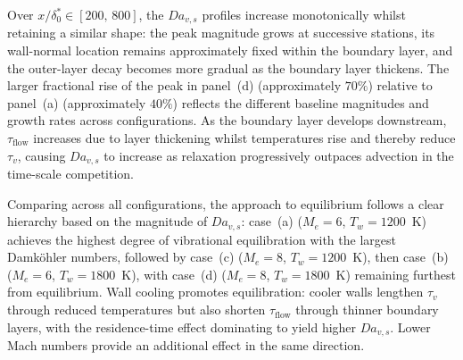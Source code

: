 Over \(x/\delta_0^{*}\in[200,\,800]\), the \(Da_{v,s}\) profiles increase monotonically whilst retaining a similar shape: the peak magnitude grows at successive stations, its wall-normal location remains approximately fixed within the boundary layer, and the outer-layer decay becomes more gradual as the boundary layer thickens. The larger fractional rise of the peak in panel~(d) (approximately \(70\%\)) relative to panel~(a) (approximately \(40\%\)) reflects the different baseline magnitudes and growth rates across configurations. As the boundary layer develops downstream, \(\tau_{\mathrm{flow}}\) increases due to layer thickening whilst temperatures rise and thereby reduce \(\tau_v\), causing \(Da_{v,s}\) to increase as relaxation progressively outpaces advection in the time-scale competition.

Comparing across all configurations, the approach to equilibrium follows a clear hierarchy based on the magnitude of \(Da_{v,s}\): case~(a) (\(M_e = 6\), \(T_w = 1200\)~K) achieves the highest degree of vibrational equilibration with the largest Damköhler numbers, followed by case~(c) (\(M_e = 8\), \(T_w = 1200\)~K), then case~(b) (\(M_e = 6\), \(T_w = 1800\)~K), with case~(d) (\(M_e = 8\), \(T_w = 1800\)~K) remaining furthest from equilibrium. Wall cooling promotes equilibration: cooler walls lengthen \(\tau_v\) through reduced temperatures but also shorten \(\tau_{\mathrm{flow}}\) through thinner boundary layers, with the residence-time effect dominating to yield higher \(Da_{v,s}\). Lower Mach numbers provide an additional effect in the same direction.











